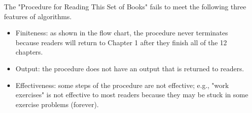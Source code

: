 \documentclass[letterpaper, reqno,11pt]{article}
\begin{document}
\medskip

 The "Procedure for Reading This Set of Books" fails to meet the following three features of algorithms.
\begin{itemize}
    \item Finiteness: as shown in the flow chart, the procedure never terminates because readers will return to Chapter 1 after they finish all of the 12 chapters.
    \item Output: the procedure does not have an output that is returned to readers.
    \item Effectiveness: some steps of the procedure are not effective; e.g., "work exercises" is not effective to most readers because they may be stuck in some exercise problems (forever).
\end{itemize}

\medskip
\end{document}
